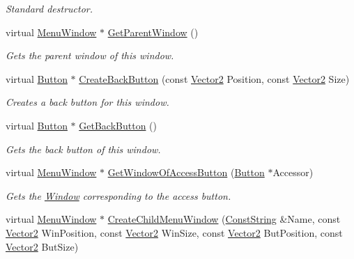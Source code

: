\begin{DoxyCompactItemize}
\begin{DoxyCompactList}\small\item\em Standard destructor. \item\end{DoxyCompactList}\item 
virtual \hyperlink{classphys_1_1UI_1_1MenuWindow}{MenuWindow} $\ast$ \hyperlink{classphys_1_1UI_1_1MenuWindow_ac47ccc564f09ac33e13e56860b6ae281}{GetParentWindow} ()
\begin{DoxyCompactList}\small\item\em Gets the parent window of this window. \item\end{DoxyCompactList}\item 
virtual \hyperlink{classphys_1_1UI_1_1Button}{Button} $\ast$ \hyperlink{classphys_1_1UI_1_1MenuWindow_acb16433bca03c75b71ddb74d8df5b5ab}{CreateBackButton} (const \hyperlink{classphys_1_1Vector2}{Vector2} Position, const \hyperlink{classphys_1_1Vector2}{Vector2} Size)
\begin{DoxyCompactList}\small\item\em Creates a back button for this window. \item\end{DoxyCompactList}\item 
virtual \hyperlink{classphys_1_1UI_1_1Button}{Button} $\ast$ \hyperlink{classphys_1_1UI_1_1MenuWindow_a7c286758bac0e21154f41a56d9da8c08}{GetBackButton} ()
\begin{DoxyCompactList}\small\item\em Gets the back button of this window. \item\end{DoxyCompactList}\item 
virtual \hyperlink{classphys_1_1UI_1_1MenuWindow}{MenuWindow} $\ast$ \hyperlink{classphys_1_1UI_1_1MenuWindow_a12b1586cd33bc03b5902018376878961}{GetWindowOfAccessButton} (\hyperlink{classphys_1_1UI_1_1Button}{Button} $\ast$Accessor)
\begin{DoxyCompactList}\small\item\em Gets the \hyperlink{classphys_1_1UI_1_1Window}{Window} corresponding to the access button. \item\end{DoxyCompactList}\item 
virtual \hyperlink{classphys_1_1UI_1_1MenuWindow}{MenuWindow} $\ast$ \hyperlink{classphys_1_1UI_1_1MenuWindow_a5da3c65def5ce495685c086750e55132}{CreateChildMenuWindow} (\hyperlink{namespacephys_a5ce5049f8b4bf88d6413c47b504ebb31}{ConstString} \&Name, const \hyperlink{classphys_1_1Vector2}{Vector2} WinPosition, const \hyperlink{classphys_1_1Vector2}{Vector2} WinSize, const \hyperlink{classphys_1_1Vector2}{Vector2} ButPosition, const \hyperlink{classphys_1_1Vector2}{Vector2} ButSize)

\end{DoxyCompactItemize}
